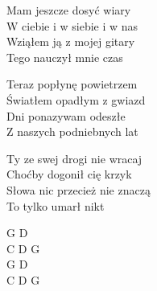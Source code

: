 \begin{text}
Mam jeszcze dosyć wiary\\ 
W ciebie i w siebie i w nas\\
Wziąłem ją z mojej gitary\\
Tego nauczył mnie czas

Teraz popłynę powietrzem\\
Światłem opadłym z gwiazd\\
Dni ponazywam odeszłe\\
Z naszych podniebnych lat

Ty ze swej drogi nie wracaj\\
Choćby dogonił cię krzyk\\
Słowa nic przecież nie znaczą\\
To tylko umarł nikt
\end{text}
\begin{chord}
G D\\
C D G\\
G D\\
C D G
\end{chord}